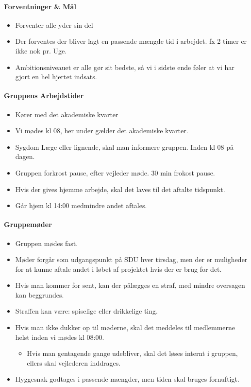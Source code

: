 \paragraph{Forventninger \& Mål}
\begin{itemize}
    \item Forventer alle yder sin del
    \item Der forventes der bliver lagt en passende mængde tid i arbejdet. fx 2 timer er ikke nok pr. Uge.
    \item Ambitionsniveauet er alle gør sit bedste, så vi i sidste ende føler at vi har gjort en hel hjertet indsats.
\end{itemize}

\paragraph{Gruppens Arbejdstider}
\begin{itemize}
    \item Kører med det akademiske kvarter
    \item Vi mødes kl 08, her under gælder det akademiske kvarter.
    \item Sygdom Læge eller lignende, skal man informere gruppen. Inden kl 08 på dagen.
    \item Gruppen forkrost pause, efter vejleder møde. 30 min frokost pause.
    \item Hvis der gives hjemme arbejde, skal det laves til det aftalte tidspunkt.
    \item Går hjem kl 14:00 medmindre andet aftales.
\end{itemize}

\paragraph{Gruppemøder}
\begin{itemize}
    \item Gruppen mødes fast.
    \item Møder forgår som udgangspunkt på SDU hver tirsdag, men der er muligheder for at kunne aftale andet i løbet af projektet hvis der er brug for det.
    \item Hvis man kommer for sent, kan der pålægges en straf, med mindre oversagen kan beggrundes.
    \item Straffen kan være: spiselige eller drikkelige ting. 
    \item Hvis man ikke dukker op til møderne, skal det meddeles til medlemmerne helst inden vi mødes kl 08:00.
	\begin{itemize}
	    \item Hvis man gentagende gange udebliver, skal det løses internt i gruppen, ellers skal vejlederen inddrages.
	\end{itemize}
    \item Hyggesnak godtages i passende mængder, men tiden skal bruges fornuftigt.
\end{itemize}


